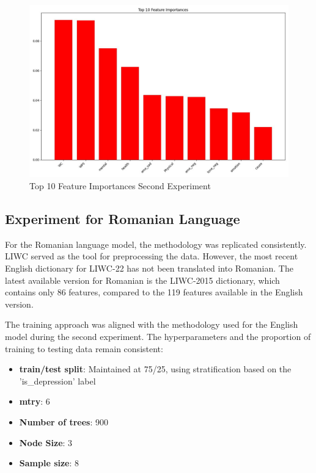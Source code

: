 \begin{figure}[htbp]
	\centering
		\includegraphics[scale=0.5]{LaTeX Bachelor Thesis Depression Signs Detection/figures/metrics/experiment2English/top10features.jpg}
	\caption{Top 10 Feature Importances Second Experiment}
	\label{top10FeaturesSecondExperiment}
\end{figure}

\subsection{Experiment for Romanian Language}

\quad For the Romanian language model, the methodology was replicated consistently. LIWC served as the tool for preprocessing the data. However, the most recent English dictionary for LIWC-22 has not been translated into Romanian. The latest available version for Romanian is the LIWC-2015 dictionary, which contains only 86 features, compared to the 119 features available in the English version.

The training approach was aligned with the methodology used for the English model during the second experiment. The hyperparameters and the proportion of training to testing data remain consistent:

\begin{itemize}
\item \textbf{train/test split}: Maintained at 75/25, using stratification based on the 'is\_depression' label
\item \textbf{mtry}: 6
\item \textbf{Number of trees}: 900
\item \textbf{Node Size}: 3
\item \textbf{Sample size}: 8
\end{itemize}

